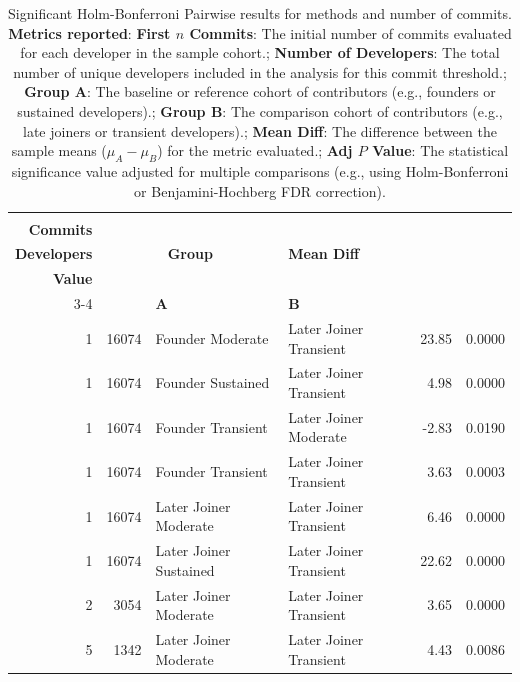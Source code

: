\newpage 
\begin{table}[H]
\centering
\setlength{\tabcolsep}{2pt}
\caption[Significant Holm-Bonferroni Pairwise results for methods]{Significant Holm-Bonferroni Pairwise results for methods and number of commits. \\ \textbf{Metrics reported}:   \textbf{First $n$ Commits}: The initial number of commits evaluated for each developer in the sample cohort.;  \textbf{Number of Developers}: The total number of unique developers included in the analysis for this commit threshold.;  \textbf{Group A}: The baseline or reference cohort of contributors (e.g., founders or sustained developers).;  \textbf{Group B}: The comparison cohort of contributors (e.g., late joiners or transient developers).;  \textbf{Mean Diff}: The difference between the sample means ($\mu_A - \mu_B$) for the metric evaluated.;  \textbf{Adj $P$ Value}: The statistical significance value adjusted for multiple comparisons (e.g., using Holm-Bonferroni or Benjamini-Hochberg FDR correction).
}
\begin{tabular}{r r l l r r}
\toprule
\makecell[t]{\textbf{First $n$}\\\textbf{Commits}} & \makecell[t]{\textbf{Number of}\\\textbf{Developers}} & \multicolumn{2}{c}{\textbf{Group}} & \textbf{Mean Diff} & \makecell[t]{\textbf{Adj $P$}\\\textbf{Value}} \\ 
\cmidrule(lr){3-4}
 &  & \textbf{A} & \textbf{B} &  &  \\ 
\midrule
1 & 16074 & Founder Moderate & Later Joiner Transient & 23.85 & 0.0000 \\ 
1 & 16074 & Founder Sustained & Later Joiner Transient & 4.98 & 0.0000 \\ 
1 & 16074 & Founder Transient & Later Joiner Moderate & -2.83 & 0.0190 \\ 
1 & 16074 & Founder Transient & Later Joiner Transient & 3.63 & 0.0003 \\ 
1 & 16074 & Later Joiner Moderate & Later Joiner Transient & 6.46 & 0.0000 \\ 
1 & 16074 & Later Joiner Sustained & Later Joiner Transient & 22.62 & 0.0000 \\ 
2 & 3054 & Later Joiner Moderate & Later Joiner Transient & 3.65 & 0.0000 \\ 
5 & 1342 & Later Joiner Moderate & Later Joiner Transient & 4.43 & 0.0086 \\ 
\bottomrule
\end{tabular}%
\label{tab:codebase_graph_latex_repository_graph_component_time_series_holm_bonferroni_sig_methods} 
\end{table}
\newpage 
